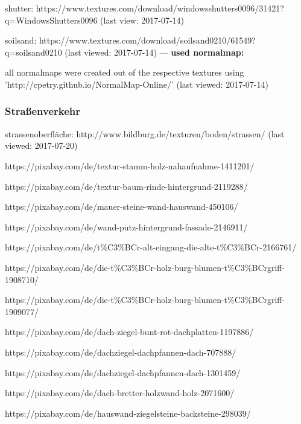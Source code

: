 \documentclass{Paper}
\begin{document}
\begin{appendix}
shutter:
https://www.textures.com/download/windowsshutters0096/31421?q=WindowsShutters0096
(last view: 2017-07-14)

soilsand:
https://www.textures.com/download/soilsand0210/61549?q=soilsand0210
(last viewed: 2017-07-14)
---
\textbf{used normalmap:}

all normalmaps were created out of the respective textures using 'http://cpetry.github.io/NormalMap-Online/'
(last viewed: 2017-07-14)

\subsubsection{Straßenverkehr}

strassenoberfläche:
http://www.bildburg.de/texturen/boden/strassen/
(last viewed: 2017-07-20)


https://pixabay.com/de/textur-stamm-holz-nahaufnahme-1411201/



https://pixabay.com/de/textur-baum-rinde-hintergrund-2119288/



https://pixabay.com/de/mauer-steine-wand-hauswand-450106/



https://pixabay.com/de/wand-putz-hintergrund-fassade-2146911/



https://pixabay.com/de/t\%C3\%BCr-alt-eingang-die-alte-t\%C3\%BCr-2166761/



https://pixabay.com/de/die-t\%C3\%BCr-holz-burg-blumen-t\%C3\%BCrgriff-1908710/



https://pixabay.com/de/die-t\%C3\%BCr-holz-burg-blumen-t\%C3\%BCrgriff-1909077/



https://pixabay.com/de/dach-ziegel-bunt-rot-dachplatten-1197886/



https://pixabay.com/de/dachziegel-dachpfannen-dach-707888/



https://pixabay.com/de/dachziegel-dachpfannen-dach-1301459/



https://pixabay.com/de/dach-bretter-holzwand-holz-2071600/



https://pixabay.com/de/hauswand-ziegelsteine-backsteine-298039/




\end{appendix}
\end{document}
